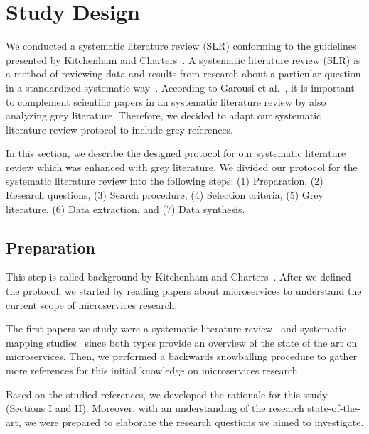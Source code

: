
\section{Study Design}\label{sec:study-design}

We conducted a systematic literature review (SLR) conforming to the guidelines presented by Kitchenham and Charters~\cite{Kitchenham2007}. A systematic literature review (SLR) is a method of reviewing data and results from research about a particular question in a standardized systematic way~\cite{Sebastian2018}. According to Garousi et al.~\cite{Garousi2016}, it is important to complement scientific papers in an systematic literature review by also analyzing grey literature. Therefore, we decided to adapt our systematic literature review protocol to include grey references.


In this section, we describe the designed protocol for our systematic literature review which was enhanced with grey literature. We divided our protocol for the systematic literature review into the following steps: (1) Preparation, (2) Research questions, (3) Search procedure, (4) Selection criteria, (5) Grey literature, (6) Data extraction, and (7) Data synthesis.

\subsection{Preparation}

This step is called background by Kitchenham and Charters~\cite{Kitchenham2007}. After we defined the protocol, we started by reading papers about microservices to understand the current scope of microservices research. 

The first papers we study were a systematic literature review~\cite{Ghani2019} and systematic mapping studies~\cite{Claus2016, Francesco2019} since both types provide an overview of the state of the art on microservices. Then, we performed a backwards snowballing procedure to gather more references for this initial knowledge on microservices research~\cite{Shady2020, Michael2018, Toledo2019, Dragoni2017, Kevin2015, Larrucea2018, Osses2019, Meshenberg2016, Matt2016, Soldani2018, Olaf2016}.

Based on the studied references, we developed the rationale for this study (Sections I and II). Moreover, with an understanding of the research state-of-the-art, we were prepared to elaborate the research questions we aimed to investigate. 

